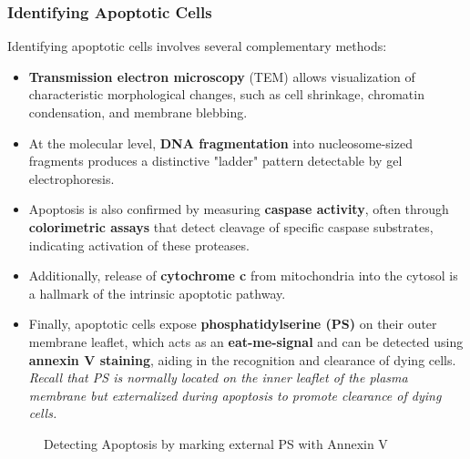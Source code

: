 \documentclass[../main.tex]{subfiles}
\begin{document}
\subsubsection{Identifying Apoptotic Cells}
Identifying apoptotic cells involves several complementary methods:
\begin{itemize}
	\item \textbf{Transmission electron microscopy} (TEM) allows visualization of characteristic morphological changes, such as cell shrinkage, chromatin condensation, and membrane blebbing.
	
	\item  At the molecular level, \textbf{DNA fragmentation} into nucleosome-sized fragments produces a distinctive "ladder" pattern detectable by gel electrophoresis.
	
	\item  Apoptosis is also confirmed by measuring \textbf{caspase activity}, often through \textbf{colorimetric assays} that detect cleavage of specific caspase substrates, indicating activation of these proteases.
	
	\item Additionally, release of \textbf{cytochrome c} from mitochondria into the cytosol is a hallmark of the intrinsic apoptotic pathway.
	
	\item  Finally, apoptotic cells expose \textbf{phosphatidylserine (PS)} on their outer membrane leaflet, which acts as an \textbf{\gls{eat-me-signal}} and can be detected using \textbf{annexin V staining}, aiding in the recognition and clearance of dying cells. \textit{Recall that PS is normally located on the inner leaflet of the plasma membrane but externalized during apoptosis to promote clearance of dying cells.}
\end{itemize}

\begin{figure}[H]
	\centering
	\caption{Detecting Apoptosis by marking external PS with Annexin V}
\end{figure}

	
\end{document}

